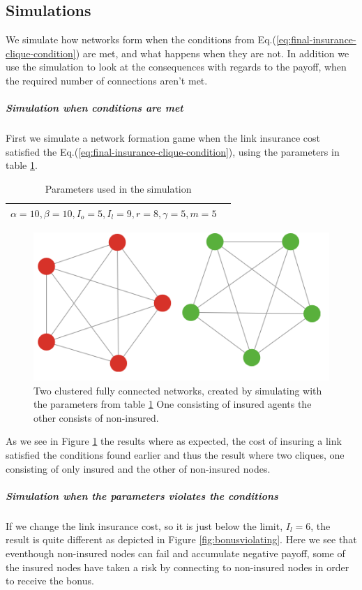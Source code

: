 \subsection{Simulations}
We simulate how networks form when the conditions from Eq.(\ref{eq:final-insurance-clique-condition}) are met, and what happens when they are not. In addition we use the simulation to look at the consequences with regards to the payoff, when the required number of connections aren't met. 

\subparagraph{Simulation when conditions are met}
First we simulate a network formation game when the link insurance cost satisfied the Eq.(\ref{eq:final-insurance-clique-condition}), using the parameters in table \ref{tbl:maxdegrevalues}. 
\begin{table}[h]
\centering
\begin{tabular}{lc}
 \hline
  $\alpha=10,
  \beta=10,
  I_{o}=5,
  I_{l}=9,
  r=8,
  \gamma=5,
  m=5
  $
  \\
  \hline
\end{tabular}
\caption{Parameters used in the simulation \label{tbl:maxdegrevalues}}
\end{table}
\begin{figure}[h]
\centering
  \includegraphics[width=0.8\linewidth]{../Figures/BonusGameInsuredClique.png}
  \caption{\label{fig:bonusoptimal} Two clustered fully connected networks, created by simulating with the parameters from table \ref{tbl:maxdegrevalues} One consisting of insured agents the other consists of non-insured. }
\end{figure}
As we see in Figure \ref{fig:bonusoptimal} the results where as expected, the cost of insuring a link satisfied the conditions found earlier and thus the result where two cliques, one consisting of only insured and the other of non-insured nodes.

\subparagraph{Simulation when the parameters violates the conditions}
If we change the link insurance cost, so it is just below the limit, $I_{l}=6$, the result is quite different as depicted in Figure \ref{fig:bonusviolating}. Here we see that eventhough non-insured nodes can fail and accumulate negative payoff, some of the insured nodes have taken a risk by connecting to non-insured nodes in order to receive the bonus. 

